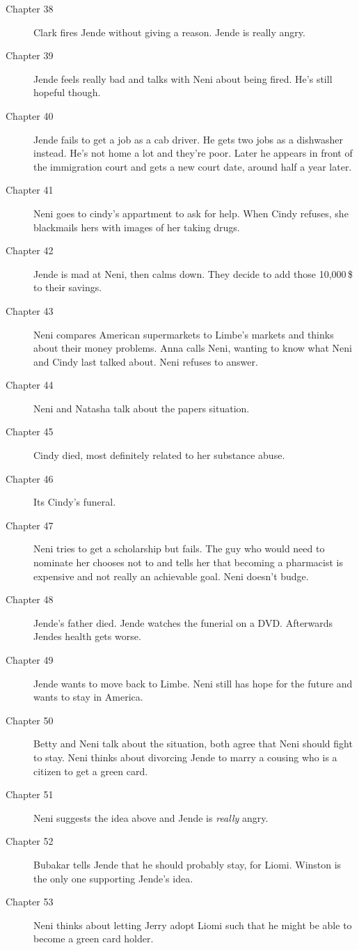 \documentclass{article}
\begin{document}
\begin{description}
 \item[Chapter 38] Clark fires Jende without giving a reason. Jende is really angry.
 \item[Chapter 39] Jende feels really bad and talks with Neni about being fired. He's still hopeful though.
 \item[Chapter 40] Jende fails to get a job as a cab driver. He gets two jobs as a dishwasher instead. He's not home a lot and they're poor. Later he appears in front of the immigration court and gets a new court date, around half a year later.
 \item[Chapter 41] Neni goes to cindy's appartment to ask for help. When Cindy refuses, she blackmails hers with images of her taking drugs.
 \item[Chapter 42] Jende is mad at Neni, then calms down. They decide to add those 10,000\,\$ to their savings.
 \item[Chapter 43] Neni compares American supermarkets to Limbe's markets and thinks about their money problems. Anna calls Neni, wanting to know what Neni and Cindy last talked about. Neni refuses to answer.
 \item[Chapter 44] Neni and Natasha talk about the papers situation.
 \item[Chapter 45] Cindy died, most definitely related to her substance abuse.
 \item[Chapter 46] Its Cindy's funeral.
 \item[Chapter 47] Neni tries to get a scholarship but fails. The guy who would need to nominate her chooses not to and tells her that becoming a pharmacist is expensive and not really an achievable goal. Neni doesn't budge.
 \item[Chapter 48] Jende's father died. Jende watches the funerial on a DVD. Afterwards Jendes health gets worse.
 \item[Chapter 49] Jende wants to move back to Limbe. Neni still has hope for the future and wants to stay in America.
 \item[Chapter 50] Betty and Neni talk about the situation, both agree that Neni should fight to stay. Neni thinks about divorcing Jende to marry a cousing who is a citizen to get a green card.
 \item[Chapter 51] Neni suggests the idea above and Jende is \emph{really} angry.
 \item[Chapter 52] Bubakar tells Jende that he should probably stay, for Liomi. Winston is the only one supporting Jende's idea.
 \item[Chapter 53] Neni thinks about letting Jerry adopt Liomi such that he might be able to become a green card holder.

\end{description}
\end{document}
